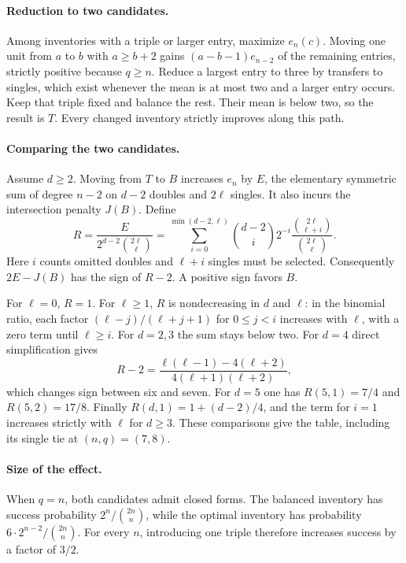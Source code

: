 \documentclass[11pt]{article}
\newcommand{\bin}[2]{\binom{#1}{#2}}
\begin{document}
\paragraph{Reduction to two candidates.}
Among inventories with a triple or larger entry, maximize $e_n(c)$.
Moving one unit from $a$ to $b$ with $a\ge b+2$ gains
$(a-b-1)e_{n-2}$ of the remaining entries, strictly positive because
$q\ge n$. Reduce a largest entry to three by transfers to singles, which
exist whenever the mean is at most two and a larger entry occurs.
Keep that triple fixed and balance the rest. Their mean is below two, so
the result is $T$. Every changed inventory strictly improves along this path.

\newpage
\paragraph{Comparing the two candidates.}
Assume $d\ge2$. Moving from $T$ to $B$ increases $e_n$ by $E$, the
elementary symmetric sum of degree $n-2$ on $d-2$ doubles and $2\ell$
singles. It also incurs the intersection penalty $J(B)$. Define
\[
R=\frac{E}{2^{d-2}\bin{2\ell}{\ell}}
=\sum_{i=0}^{\min(d-2,\ell)}
\bin{d-2}{i}2^{-i}
\frac{\bin{2\ell}{\ell+i}}{\bin{2\ell}{\ell}} .
\]
Here $i$ counts omitted doubles and $\ell+i$ singles must be selected.
Consequently $2E-J(B)$ has the sign of $R-2$. A positive sign favors $B$.

For $\ell=0$, $R=1$. For $\ell\ge1$, $R$ is nondecreasing in $d$ and $\ell$:
in the binomial ratio, each factor $(\ell-j)/(\ell+j+1)$ for
$0\le j<i$ increases with $\ell$, with a zero term until $\ell\ge i$.
For $d=2,3$ the sum stays below two. For $d=4$ direct simplification gives
\[
R-2=\frac{\ell(\ell-1)-4(\ell+2)}{4(\ell+1)(\ell+2)},
\]
which changes sign between six and seven. For $d=5$ one has
$R(5,1)=7/4$ and $R(5,2)=17/8$. Finally
$R(d,1)=1+(d-2)/4$, and the term for $i=1$ increases strictly with
$\ell$ for $d\ge3$. These comparisons give the table, including its
single tie at $(n,q)=(7,8)$.

\paragraph{Size of the effect.}
When $q=n$, both candidates admit closed forms. The balanced inventory
has success probability $2^n/\bin{2n}{n}$, while the optimal inventory
has probability $6\cdot2^{n-2}/\bin{2n}{n}$. For every $n$, introducing
one triple therefore increases success by a factor of $3/2$.
\end{document}
